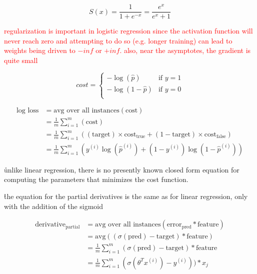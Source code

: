 \begin{equation}
{S(x)={\frac{1}{1+e^{-x}}}={\frac{e^x}{e^x+1}}}
\label{eq:sigmoid_def}
\end{equation}

\textcolor{red}{regularization is important in logistic regression since the activation function will never reach zero and attempting to do so (e.g. longer training) can lead to weights being driven to $-inf$ or $+inf$. also, near the asymptotes, the gradient is quite small}

\begin{equation}
cost =	\left\{
	\begin{array}{ll}
		-\log (\hat{p}) & \textrm{if }  y = 1 \\
		-\log (1 - \hat{p}) & \textrm{if }  y = 0 \\
	\end{array} 
	\right.
\end{equation}


\begin{equation}
	\begin{split}
		\textrm{log loss} & =  \textrm{avg over all instances} ( \textrm{cost} ) \\
		& =  \frac{1}{m} \sum_{i=1}^{m} ( \textrm{cost} ) \\
		& =  \frac{1}{m} \sum_{i=1}^{m}(   (\textrm{target}) \times \textrm{cost}_ \textrm{true} +  (1 - \textrm{target}) \times \textrm{cost}_ \textrm{false} ) \\
		& =  \frac{1}{m} \sum_{i=1}^{m}( y^{(i)} \log ({\hat{p}}^{(i)}) +(1-y^{(i)}) \log (1 - \hat{p}^{(i)}) )
	\end{split}
\end{equation}

\r{unlike linear regression, there is no presently known closed form equation for computing the parameters that minimizes the cost function.}

\r{the equation for the partial derivatives is the same as for linear regression, only with the addition of the sigmoid}

\begin{equation}
	\begin{split}
		 \textrm{derivative}_ \textrm{partial} & =  \textrm{avg over all instances} ( \textrm{error}_\textrm{pred} *  \textrm{feature}) \\
		& =  \textrm{avg}((\sigma ( \textrm{pred}) -  \textrm{target}) *  \textrm{feature}) \\
		& = \frac{1}{m} \sum_{i=1}^{m}(\sigma ( \textrm{pred}) -  \textrm{target}) *  \textrm{feature} \\
		& = \frac{1}{m} \sum_{i=1}^{m}(\sigma ( \theta^T x^{(i)}) -  y^{(i)})) *  x_j 
	\end{split}
\end{equation}

